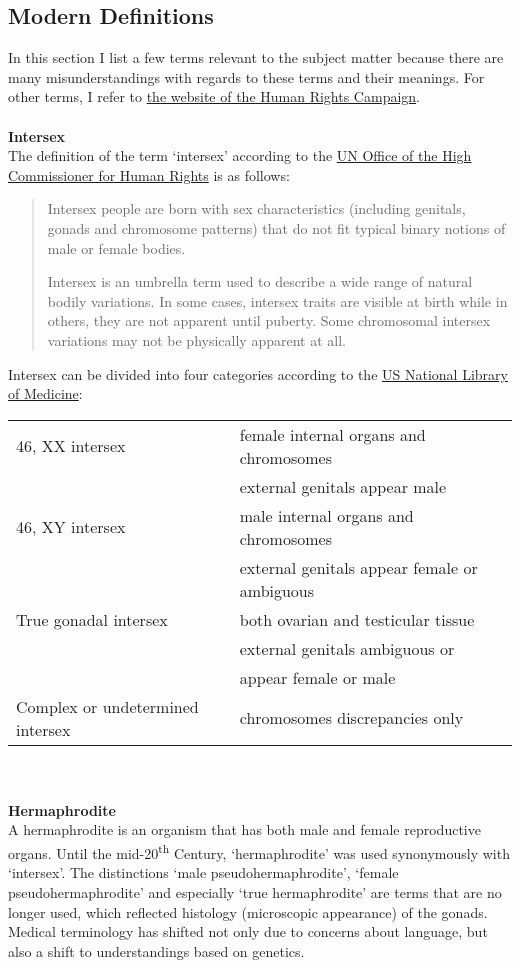 \subsection{Modern Definitions}
In this section I list a few terms relevant to the subject matter because there are many misunderstandings with regards to these terms and their meanings. For other terms, I refer to \href{https://www.hrc.org/resources/glossary-of-terms}{the website of the Human Rights Campaign}.\\
\\
\medskip
\large \textbf{Intersex}
\label{intersex}
\medskip
\\
The definition of the term `intersex' according to the \href{https://unfe.org/system/unfe-65-Intersex_Factsheet_ENGLISH.pdf}{UN Office of the High Commissioner for Human Rights} is as follows:

\begin{quote}
Intersex people are born with sex characteristics (including genitals, gonads and chromosome patterns) that do not fit typical binary notions of male or female bodies.

Intersex is an umbrella term used to describe a wide range of natural bodily variations. In some cases, intersex traits are visible at birth while in others, they are not apparent until puberty. Some chromosomal intersex variations may not be physically apparent at all.
\end{quote}

Intersex can be divided into four categories according to the \href{https://medlineplus.gov/ency/article/001669.htm}{US National Library of Medicine}:

\begin{tabular}{ l l }
46, XX intersex & female internal organs and chromosomes \\
& external genitals appear male \\
46, XY intersex & male internal organs and chromosomes \\
& external genitals appear female or ambiguous \\
True gonadal intersex & both ovarian and testicular tissue \\
& external genitals ambiguous or \\
& appear female or male \\
Complex or undetermined intersex & chromosomes discrepancies only \\
\end{tabular}
\\\\
\bigskip
\large \textbf{Hermaphrodite}
\medskip
\label{hermaphrodite}
\\
A hermaphrodite is an organism that has both male and female reproductive organs. Until the mid-20\textsuperscript{th} Century, `hermaphrodite' was used synonymously with `intersex'. The distinctions `male pseudohermaphrodite', `female pseudohermaphrodite' and especially `true hermaphrodite' are terms that are no longer used, which reflected histology (microscopic appearance) of the gonads. Medical terminology has shifted not only due to concerns about language, but also a shift to understandings based on genetics.

